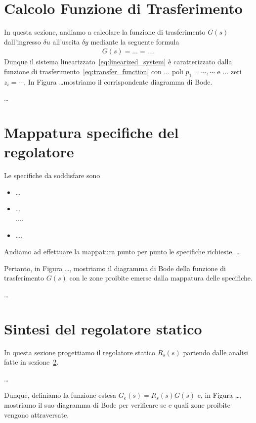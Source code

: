 \documentclass[a4paper, 11pt]{article}
\begin{document}
\section{Calcolo Funzione di Trasferimento}

In questa sezione, andiamo a calcolare la funzione di trasferimento $G(s)$ dall'ingresso $\delta u$ all'uscita $\delta y$ mediante la seguente formula 
%
%
\begin{align}\label{eq:transfer_function}
G(s) = \dots = \dots.
\end{align}
%
Dunque il sistema linearizzato~\eqref{eq:linearized_system} è caratterizzato dalla funzione di trasferimento~\eqref{eq:transfer_function} con $\dots$ poli $p_1 = \cdots, \cdots$ e $\dots$ zeri $z_i =\cdots$. In Figura \dots mostriamo il corrispondente diagramma di Bode. 

\dots

\section{Mappatura specifiche del regolatore}
\label{sec:specifications}

Le specifiche da soddisfare sono
\begin{itemize}
	\item[1)] \dots\\
	\item[2)] \dots\\
	....\\
	\item[6)] \dots.
\end{itemize}
%
Andiamo ad effettuare la mappatura punto per punto le specifiche richieste. \dots  

Pertanto, in Figura \dots, mostriamo il diagramma di Bode della funzione di trasferimento $G(s)$ con le zone proibite emerse dalla mappatura delle specifiche.

\dots

\section{Sintesi del regolatore statico}
\label{sec:static_regulator}

In questa sezione progettiamo il regolatore statico $R_s(s)$ partendo dalle analisi fatte in sezione~\ref{sec:specifications}.

\dots

Dunque, definiamo la funzione estesa $G_e(s) = R_s(s)G(s)$ e, in Figura \dots, mostriamo il suo diagramma di Bode per verificare se e quali zone proibite vengono attraversate.
\end{document}
